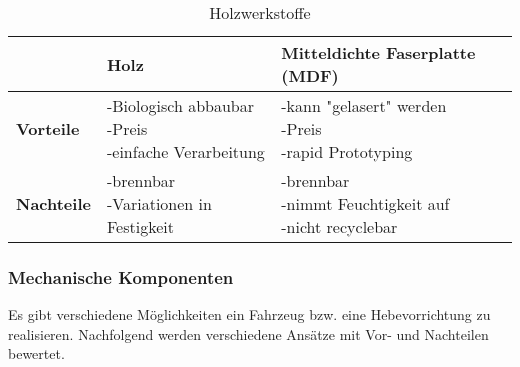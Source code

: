\begin{table}[H]
\centering
\small
\begin{tabularx}{\textwidth}{|l|X|X|}
\hline
  \textbf{} & \textbf{Holz} & \textbf{Mitteldichte Faserplatte (MDF)} \\
  \hline
  \textbf{Vorteile}  & \makecell{-Biologisch abbaubar\\ -Preis \\ -einfache Verarbeitung} & \makecell{-kann "gelasert"  werden \\-Preis\\ -rapid Prototyping}\\
  \hline
  \textbf{Nachteile} & \makecell{-brennbar \\ -Variationen in Festigkeit} & \makecell{-brennbar\\-nimmt Feuchtigkeit auf\\-nicht recyclebar}\\
  \hline
\end{tabularx}
\caption{Holzwerkstoffe}
\label{table:woods-comparison}
\end{table}

\newpage

\subsubsection{Mechanische Komponenten}

Es gibt verschiedene Möglichkeiten ein Fahrzeug bzw. eine Hebevorrichtung zu realisieren. Nachfolgend werden verschiedene Ansätze mit Vor- und Nachteilen bewertet.

